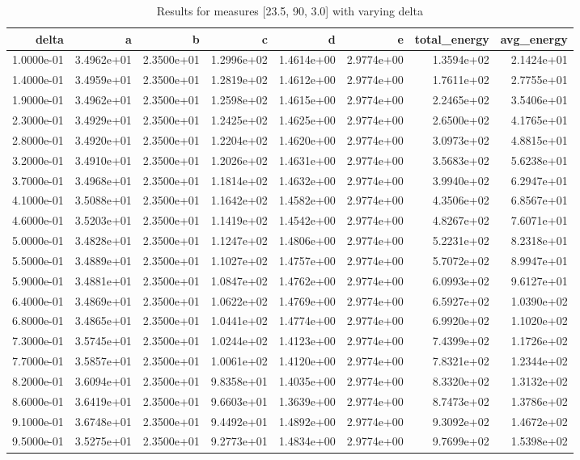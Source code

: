\begin{table}
\caption{Results for measures [23.5, 90, 3.0] with varying delta}
\label{tab:results_23.5_90_3.0}
\begin{tabular}{rrrrrrrr}
\toprule
delta & a & b & c & d & e & total_energy & avg_energy \\
\midrule
1.0000e-01 & 3.4962e+01 & 2.3500e+01 & 1.2996e+02 & 1.4614e+00 & 2.9774e+00 & 1.3594e+02 & 2.1424e+01 \\
1.4000e-01 & 3.4959e+01 & 2.3500e+01 & 1.2819e+02 & 1.4612e+00 & 2.9774e+00 & 1.7611e+02 & 2.7755e+01 \\
1.9000e-01 & 3.4962e+01 & 2.3500e+01 & 1.2598e+02 & 1.4615e+00 & 2.9774e+00 & 2.2465e+02 & 3.5406e+01 \\
2.3000e-01 & 3.4929e+01 & 2.3500e+01 & 1.2425e+02 & 1.4625e+00 & 2.9774e+00 & 2.6500e+02 & 4.1765e+01 \\
2.8000e-01 & 3.4920e+01 & 2.3500e+01 & 1.2204e+02 & 1.4620e+00 & 2.9774e+00 & 3.0973e+02 & 4.8815e+01 \\
3.2000e-01 & 3.4910e+01 & 2.3500e+01 & 1.2026e+02 & 1.4631e+00 & 2.9774e+00 & 3.5683e+02 & 5.6238e+01 \\
3.7000e-01 & 3.4968e+01 & 2.3500e+01 & 1.1814e+02 & 1.4632e+00 & 2.9774e+00 & 3.9940e+02 & 6.2947e+01 \\
4.1000e-01 & 3.5088e+01 & 2.3500e+01 & 1.1642e+02 & 1.4582e+00 & 2.9774e+00 & 4.3506e+02 & 6.8567e+01 \\
4.6000e-01 & 3.5203e+01 & 2.3500e+01 & 1.1419e+02 & 1.4542e+00 & 2.9774e+00 & 4.8267e+02 & 7.6071e+01 \\
5.0000e-01 & 3.4828e+01 & 2.3500e+01 & 1.1247e+02 & 1.4806e+00 & 2.9774e+00 & 5.2231e+02 & 8.2318e+01 \\
5.5000e-01 & 3.4889e+01 & 2.3500e+01 & 1.1027e+02 & 1.4757e+00 & 2.9774e+00 & 5.7072e+02 & 8.9947e+01 \\
5.9000e-01 & 3.4881e+01 & 2.3500e+01 & 1.0847e+02 & 1.4762e+00 & 2.9774e+00 & 6.0993e+02 & 9.6127e+01 \\
6.4000e-01 & 3.4869e+01 & 2.3500e+01 & 1.0622e+02 & 1.4769e+00 & 2.9774e+00 & 6.5927e+02 & 1.0390e+02 \\
6.8000e-01 & 3.4865e+01 & 2.3500e+01 & 1.0441e+02 & 1.4774e+00 & 2.9774e+00 & 6.9920e+02 & 1.1020e+02 \\
7.3000e-01 & 3.5745e+01 & 2.3500e+01 & 1.0244e+02 & 1.4123e+00 & 2.9774e+00 & 7.4399e+02 & 1.1726e+02 \\
7.7000e-01 & 3.5857e+01 & 2.3500e+01 & 1.0061e+02 & 1.4120e+00 & 2.9774e+00 & 7.8321e+02 & 1.2344e+02 \\
8.2000e-01 & 3.6094e+01 & 2.3500e+01 & 9.8358e+01 & 1.4035e+00 & 2.9774e+00 & 8.3320e+02 & 1.3132e+02 \\
8.6000e-01 & 3.6419e+01 & 2.3500e+01 & 9.6603e+01 & 1.3639e+00 & 2.9774e+00 & 8.7473e+02 & 1.3786e+02 \\
9.1000e-01 & 3.6748e+01 & 2.3500e+01 & 9.4492e+01 & 1.4892e+00 & 2.9774e+00 & 9.3092e+02 & 1.4672e+02 \\
9.5000e-01 & 3.5275e+01 & 2.3500e+01 & 9.2773e+01 & 1.4834e+00 & 2.9774e+00 & 9.7699e+02 & 1.5398e+02 \\
\bottomrule
\end{tabular}
\end{table}

